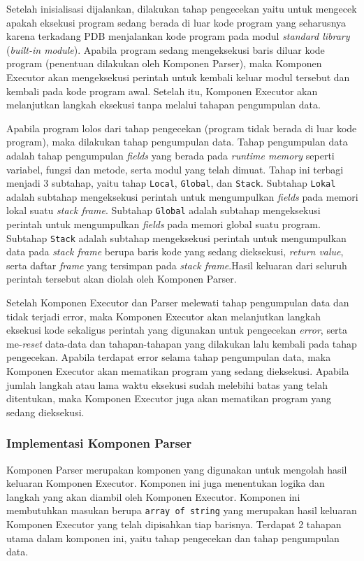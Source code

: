 Setelah inisialisasi dijalankan, dilakukan tahap pengecekan yaitu untuk mengecek apakah eksekusi program sedang berada di luar kode program yang seharusnya karena terkadang PDB menjalankan kode program pada modul \textit{standard library} (\textit{built-in module}). Apabila program sedang mengeksekusi baris diluar kode program (penentuan dilakukan oleh Komponen Parser), maka Komponen Executor akan mengeksekusi perintah untuk kembali keluar modul tersebut dan kembali pada kode program awal. Setelah itu, Komponen Executor akan melanjutkan langkah eksekusi tanpa melalui tahapan pengumpulan data.

Apabila program lolos dari tahap pengecekan (program tidak berada di luar kode program), maka dilakukan tahap pengumpulan data. Tahap pengumpulan data adalah tahap pengumpulan \textit{fields} yang berada pada \textit{runtime memory} seperti variabel, fungsi dan metode, serta modul yang telah dimuat. Tahap ini terbagi menjadi 3 subtahap, yaitu tahap \verb|Local|, \verb|Global|, dan \verb|Stack|. Subtahap \verb|Lokal| adalah subtahap mengeksekusi perintah untuk mengumpulkan \textit{fields} pada memori lokal suatu \textit{stack frame}. Subtahap \verb|Global| adalah subtahap mengeksekusi perintah untuk mengumpulkan \textit{fields} pada memori global suatu program. Subtahap \verb|Stack| adalah subtahap mengeksekusi perintah untuk mengumpulkan data pada \textit{stack frame} berupa baris kode yang sedang dieksekusi, \textit{return value}, serta daftar \textit{frame} yang tersimpan pada \textit{stack frame}.Hasil keluaran dari seluruh perintah tersebut akan diolah oleh Komponen Parser.

Setelah Komponen Executor dan Parser melewati tahap pengumpulan data dan tidak terjadi error, maka Komponen Executor akan melanjutkan langkah eksekusi kode sekaligus perintah yang digunakan untuk pengecekan \textit{error}, serta me-\textit{reset} data-data dan tahapan-tahapan yang dilakukan lalu kembali pada tahap pengecekan. Apabila terdapat error selama tahap pengumpulan data, maka Komponen Executor akan mematikan program yang sedang dieksekusi. Apabila jumlah langkah atau lama waktu eksekusi sudah melebihi batas yang telah ditentukan, maka Komponen Executor juga akan mematikan program yang sedang dieksekusi.


\subsubsection{Implementasi Komponen Parser}
Komponen Parser merupakan komponen yang digunakan untuk mengolah hasil keluaran Komponen Executor. Komponen ini juga menentukan logika dan langkah yang akan diambil oleh Komponen Executor. Komponen ini membutuhkan masukan berupa \verb|array of string| yang merupakan hasil keluaran Komponen Executor yang telah dipisahkan tiap barisnya. Terdapat 2 tahapan utama dalam komponen ini, yaitu tahap pengecekan dan tahap pengumpulan data.

